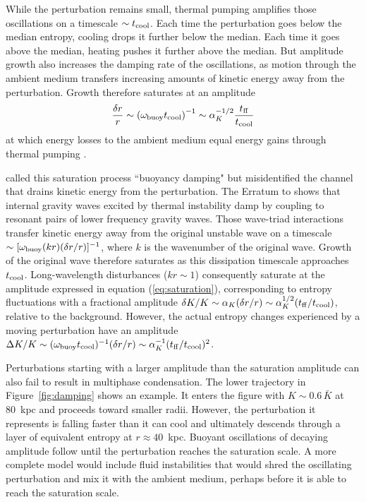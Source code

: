 \documentclass[twocolumn]{aastex63}
\begin{document}
While the perturbation remains small, thermal pumping amplifies those oscillations on a timescale $\sim t_{\rm cool}$.  Each time the perturbation goes below the median entropy, cooling drops it further below the median.  Each time it goes above the median, heating pushes it further above the median.  But amplitude growth also increases the damping rate of the oscillations, as motion through the ambient medium transfers increasing amounts of kinetic energy away from the perturbation.  Growth therefore saturates at an amplitude
\begin{equation}
    \frac {\delta r} {r} 
    \sim \left( \omega_{\rm buoy} t_{\rm cool} \right)^{-1}
    \sim \alpha_K^{-1/2} \frac {t_{\rm ff}} {t_{\rm cool}}
    \label{eq:saturation}
\end{equation}
at which energy losses to the ambient medium equal energy gains through thermal pumping \citep[e.g.,][]{Nulsen_1986MNRAS.221..377N,McCourt+2012MNRAS.419.3319M,Voit_2017_BigPaper}. 

\citet{Voit_2017_BigPaper} called this saturation process ``buoyancy damping" but misidentified the channel that drains kinetic energy from the perturbation.  The Erratum to \citet{Voit_2017_BigPaper} shows that internal gravity waves excited by thermal instability damp by coupling to resonant pairs of lower frequency gravity waves.  Those wave-triad interactions transfer kinetic energy away from the original unstable wave on a timescale $\sim [ \omega_{\rm buoy} (kr) (\delta r/r)]^{-1}$, where $k$ is the wavenumber of the original wave.  Growth of the original wave therefore saturates as this dissipation timescale approaches $t_{\rm cool}$. Long-wavelength disturbances ($kr \sim 1$) consequently saturate at the amplitude expressed in equation (\ref{eq:saturation}), corresponding to entropy fluctuations with a fractional amplitude $\delta K / K \sim \alpha_K ( \delta r / r ) \sim \alpha_K^{1/2} ( t_{\rm ff} / t_{\rm cool} )$, relative to the background.  However, the actual entropy changes experienced by a moving perturbation have an amplitude $\Delta K / K \sim (\omega_{\rm buoy} t_{\rm cool})^{-1} (\delta r/r) \sim \alpha_K^{-1} (t_{\rm ff} / t_{\rm cool} )^2$.

Perturbations starting with a larger amplitude than the saturation amplitude can also fail to result in multiphase condensation.  The lower trajectory in Figure~\ref{fig:damping} shows an example.  It enters the figure with $K \sim 0.6 \, \bar{K}$ at 80~kpc and proceeds toward smaller radii.  However, the perturbation it represents is falling faster than it can cool and ultimately descends through a layer of equivalent entropy at $r \approx 40$~kpc.  Buoyant oscillations of decaying amplitude follow until the perturbation reaches the saturation scale. A more complete model would include fluid instabilities that would shred the oscillating perturbation and mix it with the ambient medium, perhaps before it is able to reach the saturation scale. 
\end{document}
